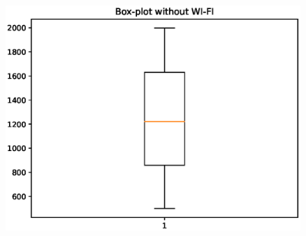 \documentclass{article}
\begin{document}
\begin{figure}[!h]
\begin{center}
\includegraphics [scale=0.4]{images/box3.eps}
\end{center}
\end{figure}
\end{document}
